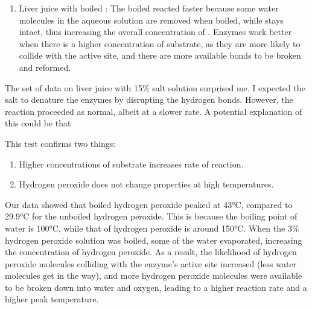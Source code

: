 \documentclass[12pt]{article}
\begin{document}
\begin{enumAlph}
\begin{enumerate}[label=\arabic*.]
        \item Liver juice with boiled : The boiled  reacted faster because 
        some water molecules in the aqueous solution are removed when boiled, while 
         stays intact, thus
        increasing the overall concentration of . Enzymes work better when 
        there is a higher concentration of substrate, as they are more likely to collide
        with the active site, and there are more available bonds to be broken 
        and reformed.

        
    \end{enumerate}

    \item The set of data on liver juice with 15\% salt solution surprised me. 
    I expected the salt to denature the enzymes by disrupting the hydrogen 
    bonds. However, the reaction proceeded as normal, albeit at a slower rate.
    A potential explanation of this could be that 

    \item This test confirms two things:
    \begin{enumerate}[label=\arabic*.]
        \item Higher concentrations of substrate increases rate of reaction.
        \item Hydrogen peroxide does not change properties at high temperatures.
    \end{enumerate}

    \item Our data showed that boiled hydrogen peroxide peaked at 43°C, 
    compared to 29.9°C for the unboiled hydrogen peroxide. This is 
    because the boiling point of water is 100°C, while that of hydrogen peroxide 
    is around 150°C. When the 3\% hydrogen peroxide solution was boiled, 
    some of the water evaporated, increasing the concentration of hydrogen peroxide. 
    As a result, the likelihood of hydrogen peroxide molecules colliding with 
    the enzyme’s active site increased (less water molecules get in the way), and more
    hydrogen peroxide molecules were available to be broken down into water and oxygen, leading
     to a higher reaction rate and a higher peak temperature.

    
\end{enumAlph}
\end{document}
